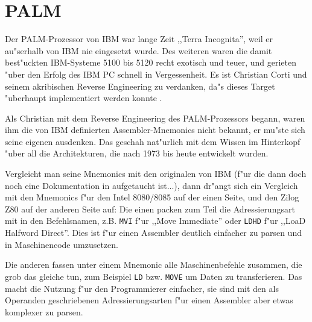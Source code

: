 \documentclass[12pt,a4paper,twoside]{report}
\begin{document}

\section{PALM}

Der PALM-Prozessor von IBM war lange Zeit ,,Terra Incognita'', weil er
au"serhalb von IBM nie eingesetzt wurde.  Des weiteren waren die damit
best"uckten IBM-Systeme 5100 bis 5120 recht exotisch und teuer, und
gerieten "uber den Erfolg des IBM PC schnell in Vergessenheit.  Es ist
Christian Corti und seinem akribischen Reverse Engineering zu
verdanken, da"s dieses Target "uberhaupt implementiert werden konnte
\cite{CortPalm}.

Als Christian mit dem Reverse Engineering des PALM-Prozessors begann,
waren ihm die von IBM definierten Assembler-Mnemonics nicht bekannt, er
mu"ste sich seine eigenen ausdenken.  Das geschah nat"urlich mit dem
Wissen im Hinterkopf "uber all die Architekturen, die nach 1973 bis
heute entwickelt wurden.

Vergleicht man seine Mnemonics mit den originalen von IBM (f"ur die
dann doch noch eine Dokumentation in \cite{IBMPalm} aufgetaucht
ist...), dann dr"angt sich ein Vergleich mit den Mnemonics f"ur den
Intel 8080/8085 auf der einen Seite, und den Zilog Z80 auf der anderen
Seite auf: Die einen packen zum Teil die Adressierungsart mit in den
Befehlsnamen, z.B.  {\tt MVI} f"ur ,,Move Immediate'' oder {\tt LDHD}
f"ur ,,LoaD Halfword Direct''.  Dies ist f"ur einen Assembler deutlich
einfacher zu parsen und in Maschinencode umzusetzen.

Die anderen fassen unter einem Mnemonic alle Maschinenbefehle
zusammen, die grob das gleiche tun, zum Beispiel {\tt LD} bzw.
{\tt MOVE} um Daten zu transferieren.  Das macht die Nutzung f"ur
den Programmierer einfacher, sie sind mit den als Operanden
geschriebenen Adressierungsarten f"ur einen Assembler aber etwas
komplexer zu parsen.
\end{document}
